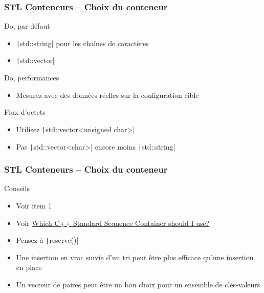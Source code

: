 \documentclass[C++.tex]{subfiles}
\begin{document}
\begin{frame}[fragile]
	\frametitle{STL Conteneurs -- Choix du conteneur}
	\begin{exampleblock}{Do, par défaut}
		\begin{itemize}
			\item \texttt|std::string| pour les chaînes de caractères
			\item \texttt|std::vector|
		\end{itemize}
	\end{exampleblock}		

	\begin{exampleblock}{Do, performances}
		\begin{itemize}
			\item Mesurez avec des données réelles sur la configuration cible
		\end{itemize}
	\end{exampleblock}

	\begin{alertblock}{Flux d'octets}
		\begin{itemize}
			\item Utilisez \texttt|std::vector<unsigned char>|
			\item Pas \texttt|std::vector<char>| encore moins \texttt|std::string|
		\end{itemize}
	\end{alertblock}
\end{frame}

\begin{frame}[fragile]
	\frametitle{STL Conteneurs -- Choix du conteneur}
	\begin{block}{Conseils}
		\begin{itemize}
			\item Voir \cite{effStl} item 1
			\item Voir \href{https://hackingcpp.com/cpp/design/which_std_sequence_container.png}{Which C++ Standard Sequence Container should I use?}
			\item Pensez à \texttt|reserve()|
			\item Une insertion en vrac suivie d'un tri peut être plus efficace qu'une insertion en place


			\item Un vecteur de paires peut être un bon choix pour un ensemble de clés-valeurs
		\end{itemize}
	\end{block}
\end{frame}
\end{document}
